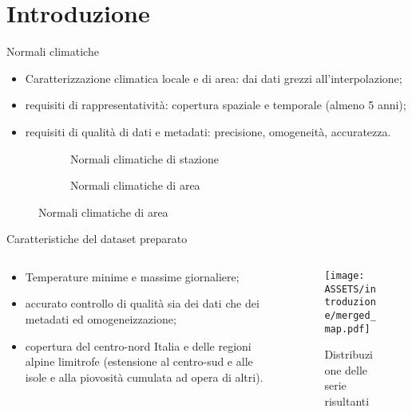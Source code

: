 
\section{Introduzione}
\begin{frame}{Normali climatiche}
  \begin{itemize}
    \item Caratterizzazione climatica locale e di area: dai dati grezzi all'interpolazione;
    \item requisiti di rappresentatività: copertura spaziale e temporale (almeno 5 anni);
    \item requisiti di qualità di dati e metadati: precisione, omogeneità, accuratezza.
  \end{itemize}
  \begin{figure}
    \centering
    \begin{subtable}[m]{0.3\textwidth}
      \centering
      \footnotesize
      
      \caption{Dato meteorologico giornaliero}
    \end{subtable}
    \hfill
    \begin{subfigure}[m]{0.3\textwidth}
      \centering
      
      \caption{Normali climatiche di stazione}
    \end{subfigure}
    \hfill
    \begin{subfigure}[m]{0.3\textwidth}
      
      \caption{Normali climatiche di area}
    \end{subfigure}
  \end{figure}
\end{frame}

\begin{frame}{Caratteristiche del dataset preparato}
  \begin{columns}
    \begin{column}{0.5\textwidth}

      \begin{itemize}
        \item Temperature minime e massime giornaliere;
        \item accurato controllo di qualità sia dei dati che dei metadati ed omogeneizzazione;
        \item copertura del centro-nord Italia e delle regioni alpine limitrofe (estensione al centro-sud e alle isole e alla piovosità cumulata ad opera di altri).
      \end{itemize}
    \end{column}
    \begin{column}{0.5\textwidth}
      \begin{figure}
        \texttt{[image: ASSETS/introduzione/merged\_map.pdf]}
        \caption*{Distribuzione delle serie risultanti}
      \end{figure}

    \end{column}
  \end{columns}
\end{frame}

